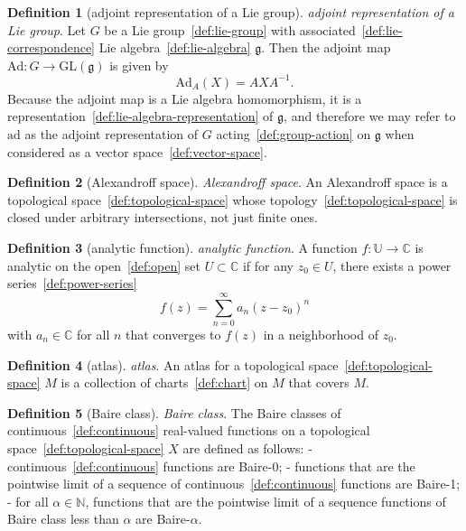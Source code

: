 \documentclass[12pt,a4paper]{article}
\theoremstyle{definition}
\newtheorem{definition}{Definition}
\begin{document}
\begin{definition}[adjoint representation of a Lie group]\label{def:adjoint-representation-of-a-lie-group}
\emph{adjoint representation of a Lie group}. Let $G$ be a Lie group~\ref{def:lie-group} with associated~\ref{def:lie-correspondence} Lie algebra~\ref{def:lie-algebra} $\mathfrak g$. Then the adjoint map $\text{Ad}:G \to \text{GL}(\mathfrak g)$ is given by $$\text{Ad}_A(X) = AXA^{-1}.$$ Because the adjoint map is a Lie algebra homomorphism, it is a representation~\ref{def:lie-algebra-representation} of $\mathfrak g$, and therefore we may refer to $\text{ad}$ as the adjoint representation of  $G$ acting~\ref{def:group-action} on $\mathfrak g$ when considered as a vector space~\ref{def:vector-space}.
\end{definition}

\begin{definition}[Alexandroff space]\label{def:alexandroff-space}
\emph{Alexandroff space}. An Alexandroff space is a topological space~\ref{def:topological-space} whose topology~\ref{def:topological-space} is closed under arbitrary intersections, not just finite ones.
\end{definition}

\begin{definition}[analytic function]\label{def:analytic-function}
\emph{analytic function}. A function $f:\mathbb U\to \mathbb C$ is analytic on the open~\ref{def:open} set $U\subset\mathbb C$ if for any $z_0\in U$, there exists a power series~\ref{def:power-series} $$f(z) = \sum_{n=0}^\infty a_n(z-z_0)^n$$ with $a_n \in \mathbb C$ for all $n$ that converges to $f(z)$ in a neighborhood of $z_0$.
\end{definition}

\begin{definition}[atlas]\label{def:atlas}
\emph{atlas}. An atlas for a topological space~\ref{def:topological-space} $M$ is a collection of charts~\ref{def:chart} on $M$ that covers $M$.
\end{definition}

\begin{definition}[Baire class]\label{def:baire-class}
\emph{Baire class}. The Baire classes of continuous~\ref{def:continuous} real-valued functions on a topological space~\ref{def:topological-space} $X$ are defined as follows:
- continuous~\ref{def:continuous} functions are Baire-0;
- functions that are the pointwise limit of a sequence of continuous~\ref{def:continuous} functions are Baire-1;
- for all $\alpha \in \mathbb N$, functions that are the pointwise limit of a sequence functions of Baire class less than $\alpha$ are Baire-$\alpha$.
\end{definition}
\end{document}
